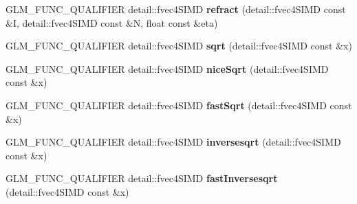 \begin{DoxyCompactItemize}
\item 
G\+L\+M\+\_\+\+F\+U\+N\+C\+\_\+\+Q\+U\+A\+L\+I\+F\+I\+ER detail\+::fvec4\+S\+I\+MD {\bfseries refract} (detail\+::fvec4\+S\+I\+MD const \&I, detail\+::fvec4\+S\+I\+MD const \&N, float const \&eta)\hypertarget{namespaceglm_a6b7db0c107279793b77576c2eef680b3}{}\label{namespaceglm_a6b7db0c107279793b77576c2eef680b3}

\item 
G\+L\+M\+\_\+\+F\+U\+N\+C\+\_\+\+Q\+U\+A\+L\+I\+F\+I\+ER detail\+::fvec4\+S\+I\+MD {\bfseries sqrt} (detail\+::fvec4\+S\+I\+MD const \&x)\hypertarget{namespaceglm_a0af4fc25d7a64d4947598f48a0229375}{}\label{namespaceglm_a0af4fc25d7a64d4947598f48a0229375}

\item 
G\+L\+M\+\_\+\+F\+U\+N\+C\+\_\+\+Q\+U\+A\+L\+I\+F\+I\+ER detail\+::fvec4\+S\+I\+MD {\bfseries nice\+Sqrt} (detail\+::fvec4\+S\+I\+MD const \&x)\hypertarget{namespaceglm_a4b8b68e979fc5b12aba9290beb8dfb30}{}\label{namespaceglm_a4b8b68e979fc5b12aba9290beb8dfb30}

\item 
G\+L\+M\+\_\+\+F\+U\+N\+C\+\_\+\+Q\+U\+A\+L\+I\+F\+I\+ER detail\+::fvec4\+S\+I\+MD {\bfseries fast\+Sqrt} (detail\+::fvec4\+S\+I\+MD const \&x)\hypertarget{namespaceglm_a668307d251c9bc5a349ab3d2d83095d4}{}\label{namespaceglm_a668307d251c9bc5a349ab3d2d83095d4}

\item 
G\+L\+M\+\_\+\+F\+U\+N\+C\+\_\+\+Q\+U\+A\+L\+I\+F\+I\+ER detail\+::fvec4\+S\+I\+MD {\bfseries inversesqrt} (detail\+::fvec4\+S\+I\+MD const \&x)\hypertarget{namespaceglm_ac3ad88ad132bb5179b928f3f57afc6b5}{}\label{namespaceglm_ac3ad88ad132bb5179b928f3f57afc6b5}

\item 
G\+L\+M\+\_\+\+F\+U\+N\+C\+\_\+\+Q\+U\+A\+L\+I\+F\+I\+ER detail\+::fvec4\+S\+I\+MD {\bfseries fast\+Inversesqrt} (detail\+::fvec4\+S\+I\+MD const \&x)\hypertarget{namespaceglm_af499190525c6e1f524054b9b18b12444}{}\label{namespaceglm_af499190525c6e1f524054b9b18b12444}


\end{DoxyCompactItemize}
